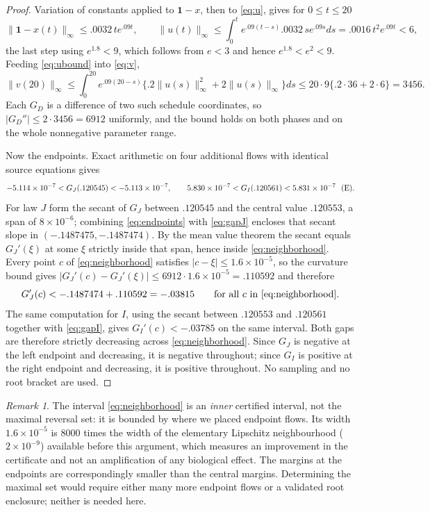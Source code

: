 \documentclass[11pt]{article}
\theoremstyle{remark}
\newtheorem{remark}[theorem]{Remark}
\newcommand{\one}{\mathbf 1}
\begin{document}
\begin{proof}
Variation of constants applied to $\one-x$, then to \eqref{eq:u}, gives for
$0\le t\le20$
\begin{equation}
 \|\one-x(t)\|_\infty\le.0032\,te^{.09t},\qquad
 \|u(t)\|_\infty\le\int_0^te^{.09(t-s)}.0032\,se^{.09s}ds=.0016\,t^2e^{.09t}<6,
 \label{eq:ubound}
\end{equation}
the last step using $e^{1.8}<9$, which follows from $e<3$ and hence
$e^{1.8}<e^2<9$. Feeding \eqref{eq:ubound} into \eqref{eq:v},
\begin{equation}
 \|v(20)\|_\infty\le\int_0^{20}e^{.09(20-s)}\bigl\{.2\|u(s)\|_\infty^2
   +2\|u(s)\|_\infty\bigr\}ds\le20\cdot9\{.2\cdot36+2\cdot6\}=3456.
 \label{eq:vbound}
\end{equation}
Each $G_D$ is a difference of two such schedule coordinates, so
$|G_D''|\le2\cdot3456=6912$ uniformly, and the bound holds on both phases and on
the whole nonnegative parameter range.

Now the endpoints. Exact arithmetic on four additional flows with identical
source equations gives
\begin{equation}
 -5.114\times10^{-7}<G_J(.120545)<-5.113\times10^{-7},\qquad
  5.830\times10^{-7}<G_I(.120561)<5.831\times10^{-7}\ \ \text{\textup{(E)}}.
 \label{eq:endpoints}
\end{equation}
For law $J$ form the secant of $G_J$ between $.120545$ and the central value
$.120553$, a span of $8\times10^{-6}$; combining \eqref{eq:endpoints} with
\eqref{eq:gapJ} encloses that secant slope in
$(-.1487475,-.1487474)$. By the mean value theorem the secant equals
$G_J'(\xi)$ at some $\xi$ strictly inside that span, hence inside
\eqref{eq:neighborhood}. Every point $c$ of \eqref{eq:neighborhood} satisfies
$|c-\xi|\le1.6\times10^{-5}$, so the curvature bound gives
$|G_J'(c)-G_J'(\xi)|\le6912\cdot1.6\times10^{-5}=.110592$ and therefore
\[
 G_J'(c)<-.1487474+.110592=-.03815\qquad\text{for all $c$ in
 \eqref{eq:neighborhood}}.
\]
The same computation for $I$, using the secant between $.120553$ and $.120561$
together with \eqref{eq:gapI}, gives $G_I'(c)<-.03785$ on the same interval.
Both gaps are therefore strictly decreasing across \eqref{eq:neighborhood}. Since
$G_J$ is negative at the left endpoint and decreasing, it is negative throughout;
since $G_I$ is positive at the right endpoint and decreasing, it is positive
throughout. No sampling and no root bracket are used.
\end{proof}

\begin{remark}
The interval \eqref{eq:neighborhood} is an \emph{inner} certified interval, not
the maximal reversal set: it is bounded by where we placed endpoint flows. Its
width $1.6\times10^{-5}$ is $8000$ times the width of the elementary Lipschitz
neighbourhood ($2\times10^{-9}$) available before this argument, which measures
an improvement in the certificate and not an amplification of any biological
effect. The margins at the endpoints are correspondingly smaller than the central
margins. Determining the maximal set would require either many more endpoint
flows or a validated root enclosure; neither is needed here.
\end{remark}
\end{document}
